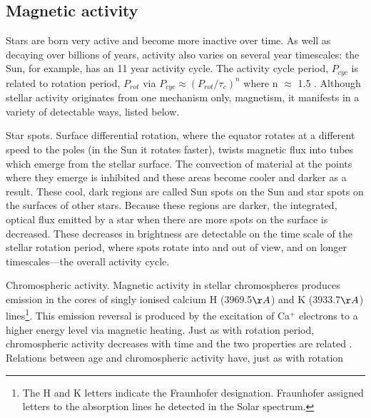\subsection{Magnetic activity}
Stars are born very active and become more inactive over time.
As well as decaying over billions of years, activity also varies on several
year timescales: the Sun, for example, has an 11 year activity cycle.
The activity cycle period, $P_{cyc}$ is related to rotation period, $P_{rot}$
via $P_{cyc} \approx (P_{rot}/\tau_c)^n$ where n $\approx$ 1.5
\citep{Noyes1984}.
Although stellar activity originates from one mechanism only, magnetism,
it manifests in a variety of detectable ways, listed below.
\begin{itemize}
\item{Star spots.
Surface differential rotation, where the equator rotates at a different speed
to the poles (in the Sun it rotates faster), twists magnetic flux into tubes
which emerge from the stellar surface.
The convection of material at the points where they emerge is inhibited and
these areas become cooler and darker as a result.
These cool, dark regions are called Sun spots on the Sun and star spots on the
surfaces of other stars.
Because these regions are darker, the integrated, optical flux emitted by a
star when there are more spots on the surface is decreased.
These decreases in brightness are detectable on the time scale of the stellar
rotation period, where spots rotate into and out of view, and on longer
timescales---the overall activity cycle.
\item{Chromospheric activity.
Magnetic activity in stellar chromospheres produces emission in the cores of
singly ionised calcium H (3969.5$\AA$) and K (3933.7$\AA$) lines\footnote{The
H and K letters indicate the Fraunhofer designation.
Fraunhofer assigned letters to the absorption lines he detected in the Solar
spectrum.}.
This emission reversal is produced by the excitation of Ca$^+$ electrons to a
higher energy level via magnetic heating.
Just as with rotation period, chromospheric activity decreases with time and
the two properties are related \citep[\eg][]{Kraft1967, Noyes1984b}.
Relations between age and chromospheric activity have, just as with rotation
}}
\end{itemize}
